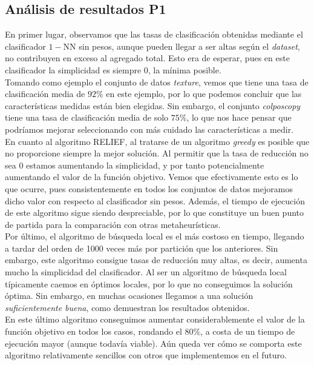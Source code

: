 \documentclass[12pt]{article}
\begin{document}
\subsection*{{\color{red}Análisis de resultados P1}}

En primer lugar, observamos que las tasas de clasificación obtenidas mediante el clasificador $1-$NN sin pesos, aunque pueden llegar a ser altas según el \textit{dataset}, no contribuyen en exceso al agregado total. Esto era de esperar, pues en este clasificador la simplicidad es siempre $0$, la mínima posible.\\

Tomando como ejemplo el conjunto de datos \textit{texture}, vemos que tiene una tasa de clasificación media de $92\%$ en este ejemplo, por lo que podemos concluir que las características medidas están bien elegidas. Sin embargo, el conjunto \textit{colposcopy} tiene una tasa de clasificación media de solo $75\%$, lo que nos hace pensar que podríamos mejorar seleccionando con más cuidado las características a medir.\\

En cuanto al algoritmo RELIEF, al tratarse de un algoritmo \textit{greedy} es posible que no proporcione siempre la mejor solución. Al permitir que la tasa de reducción no sea $0$ estamos aumentando la simplicidad, y por tanto potencialmente aumentando el valor de la función objetivo. Vemos que efectivamente esto es lo que ocurre, pues consistentemente en todos los conjuntos de datos mejoramos dicho valor con respecto al clasificador sin pesos. Además, el tiempo de ejecución de este algoritmo sigue siendo despreciable, por lo que constituye un buen punto de partida para la comparación con otras metaheurísticas.\\

Por último, el algoritmo de búsqueda local es el más costoso en tiempo, llegando a tardar del orden de 1000 veces más por partición que los anteriores. Sin embargo, este algoritmo consigue tasas de reducción muy altas, es decir, aumenta mucho la simplicidad del clasificador. Al ser un algoritmo de búsqueda local típicamente caemos en óptimos locales, por lo que no conseguimos la solución óptima. Sin embargo, en muchas ocasiones llegamos a una solución \textit{suficientemente buena}, como demuestran los resultados obtenidos.\\

En este último algoritmo conseguimos aumentar considerablemente el valor de la función objetivo en todos los casos, rondando el 80$\%$, a costa de un tiempo de ejecución mayor (aunque todavía viable). Aún queda ver cómo se comporta este algoritmo relativamente sencillos con otros que implementemos en el futuro.\\
\end{document}
